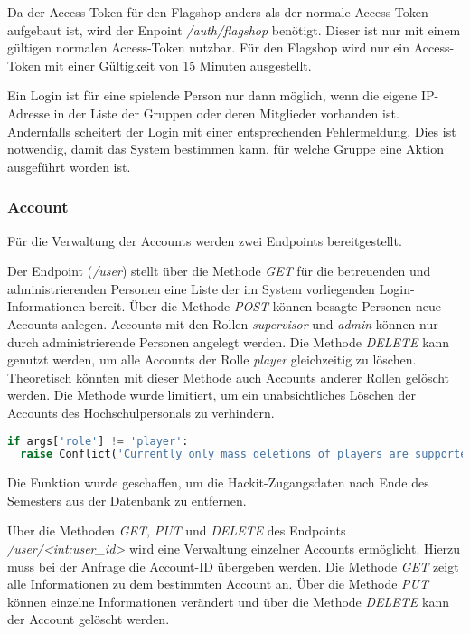 Da der Access-Token für den Flagshop anders als der normale Access-Token aufgebaut ist, wird der Enpoint \textit{/auth/flagshop} benötigt. Dieser ist nur mit einem gültigen normalen Access-Token nutzbar. Für den Flagshop wird nur ein Access-Token mit einer Gültigkeit von 15 Minuten ausgestellt.

Ein Login ist für eine spielende Person nur dann möglich, wenn die eigene IP-Adresse in der Liste der Gruppen oder deren Mitglieder vorhanden ist. Andernfalls scheitert der Login mit einer entsprechenden Fehlermeldung. Dies ist notwendig, damit das System bestimmen kann, für welche Gruppe eine Aktion ausgeführt worden ist.

\subsubsection{Account}
Für die Verwaltung der Accounts werden zwei Endpoints bereitgestellt. 

Der Endpoint (\textit{/user}) stellt über die Methode \textit{GET} für die betreuenden und administrierenden Personen eine Liste der im System vorliegenden Login-Informationen bereit. Über die Methode \textit{POST} können besagte Personen neue Accounts anlegen. Accounts mit den Rollen \textit{supervisor} und \textit{admin} können nur durch administrierende Personen angelegt werden. Die Methode \textit{DELETE} kann genutzt werden, um alle Accounts der Rolle \textit{player} gleichzeitig zu löschen. Theoretisch könnten mit dieser Methode auch Accounts anderer Rollen gelöscht werden. Die Methode wurde limitiert, um ein unabsichtliches Löschen der Accounts des Hochschulpersonals zu verhindern.

\begin{lstlisting}[language=Python, frame=single, caption={GIS Löschen auf player-Accounts begrenzen}, captionpos=b, label={lst:gis-delete-all-players}]
if args['role'] != 'player':
  raise Conflict('Currently only mass deletions of players are supported.')
\end{lstlisting}

Die Funktion wurde geschaffen, um die Hackit-Zugangsdaten nach Ende des Semesters aus der Datenbank zu entfernen.

Über die Methoden \textit{GET}, \textit{PUT} und \textit{DELETE} des Endpoints \textit{/user/<int:user\_id>} wird eine Verwaltung einzelner Accounts ermöglicht. Hierzu muss bei der Anfrage die Account-ID übergeben werden. Die Methode \textit{GET} zeigt alle Informationen zu dem bestimmten Account an. Über die Methode \textit{PUT} können einzelne Informationen verändert und über die Methode \textit{DELETE} kann der Account gelöscht werden.

